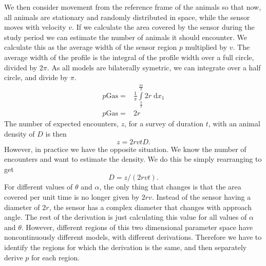 We then consider movement from the reference frame of the animals so that now, all animals are stationary and randomly distributed in space, while the sensor moves with velocity $v$. If we calculate the area covered by the sensor during the study period we can estimate the number of animals it should encounter. We calculate this as the average width of the sensor region $p$ multiplied by $v$. The average width of the profile is the integral of the profile width over a full circle, divided by $2\pi$. As all models are bilaterally symetric, we can integrate over a half circle, and divide by $\pi$.
\begin{align}
p\text{Gas} =& \frac{1}{\pi}\int\limits_{\frac{\pi}{2}}^{\frac{3\pi}{2}} 2r \; \mathrm{d}x_1\\
p\text{Gas} =& 2r
\end{align}
The number of expected encounters, $z$, for a survey of duration $t$, with an animal density of $D$ is then
\begin{equation}
	z = 2rvtD.
\end{equation}
However, in practice we have the opposite situation. We know the number of encounters and want to estimate the density. We do this be simply rearranging to get
\begin{equation}
	D = z/(2rvt).
\end{equation}
For different values of $\theta$ and $\alpha$, the only thing that changes is that the area covered per unit time is no longer given by $2rv$. Instead of the sensor having a diameter of $2r$, the sensor has a complex diameter that changes with approach angle. The rest of the derivation is just calculating this value for all values of $\alpha$ and $\theta$. However, different regions of this two dimensional parameter space have noncontinuously different models, with different derivations. Therefore we have to identify the regions for which the derivation is the same, and then separately derive $p$ for each region.
